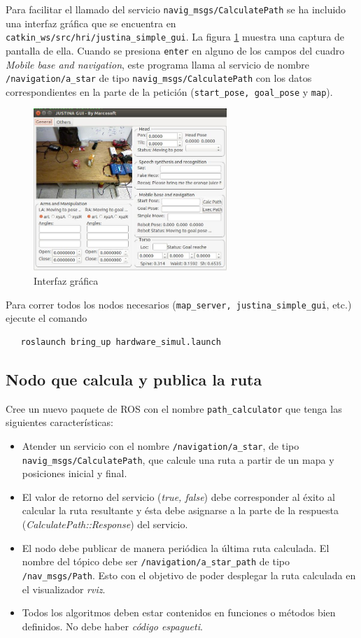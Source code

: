 \documentclass[letterpaper,12pt]{article}
\begin{document}
Para facilitar el llamado del servicio \texttt{navig\_msgs/CalculatePath} se ha incluido una interfaz gráfica que se encuentra en \texttt{catkin\_ws/src/hri/justina\_simple\_gui}. La figura \ref{fig:gui} muestra una captura de pantalla de ella. Cuando se presiona \texttt{enter} en alguno de los campos del cuadro \textit{Mobile base and navigation}, este programa llama al servicio de nombre \texttt{/navigation/a\_star} de tipo \texttt{navig\_msgs/CalculatePath} con los datos correspondientes en la parte de la petición (\texttt{start\_pose, goal\_pose} y \texttt{map}).
\begin{figure}
\centering
\includegraphics[width=0.65\textwidth]{Figures/gui.jpg}
\caption{Interfaz gráfica}
\label{fig:gui}
\end{figure}

Para correr todos los nodos necesarios (\texttt{map\_server, justina\_simple\_gui}, etc.) ejecute el comando
\begin{verbatim}
   roslaunch bring_up hardware_simul.launch
\end{verbatim}

\subsection{Nodo que calcula y publica la ruta}
Cree un nuevo paquete de ROS con el nombre \texttt{path\_calculator} que tenga las siguientes características:
\begin{itemize}
\item Atender un servicio con el nombre \texttt{/navigation/a\_star}, de tipo \texttt{navig\_msgs/CalculatePath}, que calcule una ruta a partir de un mapa y posiciones inicial y final. 
\item El valor de retorno del servicio (\textit{true, false}) debe corresponder al éxito al calcular la ruta resultante y ésta debe asignarse a la parte de la respuesta (\textit{CalculatePath::Response}) del servicio.
\item El nodo debe publicar de manera periódica la última ruta calculada. El nombre del tópico debe ser \texttt{/navigation/a\_star\_path} de tipo \texttt{/nav\_msgs/Path}. Esto con el objetivo de poder desplegar la ruta calculada en el visualizador \textit{rviz}.
\item Todos los algoritmos deben estar contenidos en funciones o métodos bien definidos. No debe haber \textit{código espagueti}.
\end{itemize}
\end{document}
